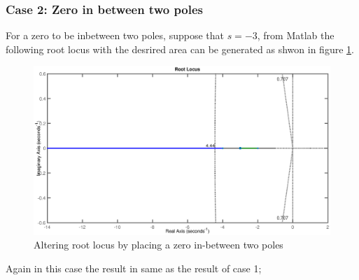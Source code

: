 \subsubsection{Case 2: Zero in between two poles}
For a zero to be inbetween two poles, suppose that $s = -3$, from Matlab the following root locus with the desrired area can be generated as shwon in figure \ref{Fig_RootLocus_ControlDesign_PD2}.
\begin{figure}[h!]
	\centering
	\includegraphics[width=\linewidth]{Bilder/RootLocus_ControlDesign_PD2.eps}
	\caption{Altering root locus by placing a zero in-between two poles}
	\label{Fig_RootLocus_ControlDesign_PD2}
\end{figure}
\newpage
Again in this case the result in same as the result of case 1;

